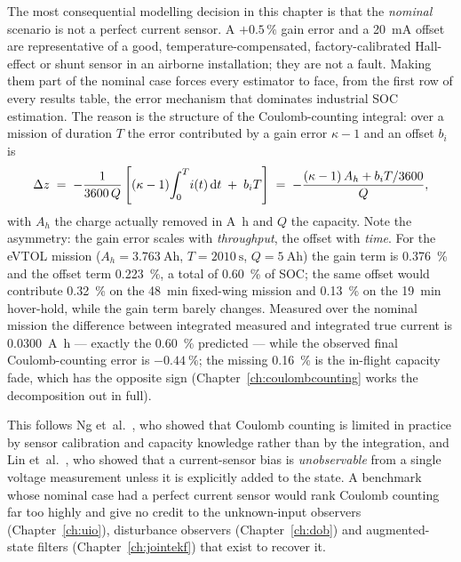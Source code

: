 The most consequential modelling decision in this chapter is that the \emph{nominal} scenario is not
a perfect current sensor. A $+0.5\,\%$ gain error and a \SI{20}{\milli\ampere} offset are
representative of a good, temperature-compensated, factory-calibrated Hall-effect or shunt sensor in
an airborne installation; they are not a fault. Making them part of the nominal case forces every
estimator to face, from the first row of every results table, the error mechanism that dominates
industrial SOC estimation. The reason is the structure of the Coulomb-counting integral: over a
mission of duration $T$ the error contributed by a gain error $\kappa-1$ and an offset $b_i$ is
\begin{equation}
\Delta z \;=\; -\frac{1}{3600\,Q}\left[(\kappa-1)\!\int_0^T\! i(t)\,\mathrm{d}t \;+\; b_i T\right]
 \;=\; -\frac{(\kappa-1)\,A_h + b_i T/3600}{Q},
\label{eq:ds-ccbias}
\end{equation}
with $A_h$ the charge actually removed in \si{\ampere\hour} and $Q$ the capacity. Note the
asymmetry: the gain error scales with \emph{throughput}, the offset with \emph{time}. For the eVTOL
mission ($A_h = \SI{3.763}{\ampere\hour}$, $T=\SI{2010}{\second}$, $Q=\SI{5}{\ampere\hour}$) the
gain term is \SI{0.376}{\percent} and the offset term \SI{0.223}{\percent}, a total of
\SI{0.60}{\percent} of SOC; the same offset would contribute \SI{0.32}{\percent} on the
\SI{48}{\minute} fixed-wing mission and \SI{0.13}{\percent} on the \SI{19}{\minute} hover-hold,
while the gain term barely changes. Measured over the nominal mission the difference between
integrated measured and integrated true current is \SI{0.0300}{\ampere\hour} --- exactly the
\SI{0.60}{\percent} predicted --- while the observed final Coulomb-counting error is
$-\SI{0.44}{\percent}$; the missing \SI{0.16}{\percent} is the in-flight capacity fade, which has
the opposite sign (Chapter~\ref{ch:coulombcounting} works the decomposition out in full).

This follows Ng et~al.~\cite{ng2009coulomb}, who showed that Coulomb counting is limited in practice
by sensor calibration and capacity knowledge rather than by the integration, and Lin
et~al.~\cite{lin2018sensorbias}, who showed that a current-sensor bias is \emph{unobservable} from a
single voltage measurement unless it is explicitly added to the state. A benchmark whose nominal
case had a perfect current sensor would rank Coulomb counting far too highly and give no credit to
the unknown-input observers (Chapter~\ref{ch:uio}), disturbance observers (Chapter~\ref{ch:dob}) and
augmented-state filters (Chapter~\ref{ch:jointekf}) that exist to recover it.

